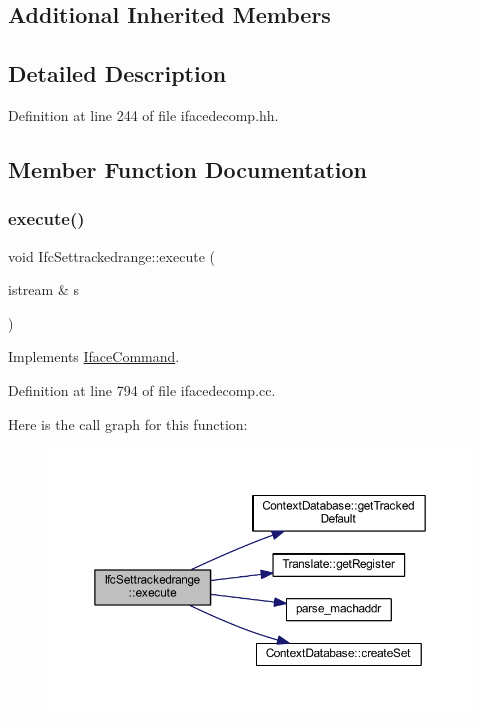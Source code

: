 \subsection*{Additional Inherited Members}


\subsection{Detailed Description}


Definition at line 244 of file ifacedecomp.\+hh.



\subsection{Member Function Documentation}
\mbox{\label{class_ifc_settrackedrange_acaa8f1641f3ffac2da07d34c377ef299}} 
\subsubsection{\texorpdfstring{execute()}{execute()}}
{\footnotesize\ttfamily void Ifc\+Settrackedrange\+::execute (\begin{DoxyParamCaption}\item[{istream \&}]{s }\end{DoxyParamCaption})\hspace{0.3cm}{\ttfamily [virtual]}}



Implements \mbox{\hyperlink{class_iface_command_af10e29cee2c8e419de6efe9e680ad201}{Iface\+Command}}.



Definition at line 794 of file ifacedecomp.\+cc.

Here is the call graph for this function\+:
\nopagebreak
\begin{figure}[H]
\begin{center}
\leavevmode
\includegraphics[width=350pt]{class_ifc_settrackedrange_acaa8f1641f3ffac2da07d34c377ef299_cgraph}
\end{center}
\end{figure}


